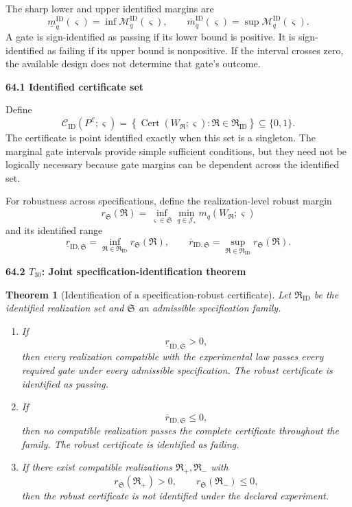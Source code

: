 \documentclass[11pt,letterpaper]{article}
\newcommand{\subtopic}[1]{%
 \vspace{0.45em}
 {\bfseries\color{AccentColor} #1\par}
}
\theoremstyle{plain}
\newtheorem{theorem}{Theorem}
\theoremstyle{definition}
\begin{document}
The sharp lower and upper identified margins are
\[
\underline m_q^{\mathrm{ID}}(\varsigma)
=
\inf\mathcal M_q^{\mathrm{ID}}(\varsigma),
\qquad
\overline m_q^{\mathrm{ID}}(\varsigma)
=
\sup\mathcal M_q^{\mathrm{ID}}(\varsigma).
\]
A gate is sign-identified as passing if its lower bound is positive. It is
sign-identified as failing if its upper bound is nonpositive. If the interval
crosses zero, the available design does not determine that gate's outcome.

\subtopic{64.1 Identified certificate set}

Define
\[
\boxed{
\mathcal C_{\mathrm{ID}}
(P^{\mathcal E};\varsigma)
=
\left\{
\operatorname{Cert}(W_{\mathfrak R};\varsigma):
\mathfrak R\in\mathfrak R_{\mathrm{ID}}
\right\}
\subseteq\{0,1\}.
}
\]
The certificate is point identified exactly when this set is a singleton. The
marginal gate intervals provide simple sufficient conditions, but they need
not be logically necessary because gate margins can be dependent across the
identified set.

For robustness across specifications, define the realization-level robust
margin
\[
r_{\mathfrak S}(\mathfrak R)
=
\inf_{\varsigma\in\mathfrak S}
\min_{q\in\mathcal J_*}
 m_q(W_{\mathfrak R};\varsigma)
\]
and its identified range
\[
\underline r_{\mathrm{ID},\mathfrak S}
=
\inf_{\mathfrak R\in\mathfrak R_{\mathrm{ID}}}
 r_{\mathfrak S}(\mathfrak R),
\qquad
\overline r_{\mathrm{ID},\mathfrak S}
=
\sup_{\mathfrak R\in\mathfrak R_{\mathrm{ID}}}
 r_{\mathfrak S}(\mathfrak R).
\]

\subtopic{64.2 \(T_{30}\): Joint specification-identification theorem}

\begin{theorem}[Identification of a specification-robust certificate]
\label{thm:joint-spec-identification}
Let \(\mathfrak R_{\mathrm{ID}}\) be the identified realization set and
\(\mathfrak S\) an admissible specification family.
\begin{enumerate}
\item If
\[
\boxed{
\underline r_{\mathrm{ID},\mathfrak S}>0,
}
\]
then every realization compatible with the experimental law passes every
required gate under every admissible specification. The robust certificate is
identified as passing.
\item If
\[
\boxed{
\overline r_{\mathrm{ID},\mathfrak S}\leq0,
}
\]
then no compatible realization passes the complete certificate throughout the
family. The robust certificate is identified as failing.
\item If there exist compatible realizations
\(\mathfrak R_+,\mathfrak R_-\) with
\[
r_{\mathfrak S}(\mathfrak R_+)>0,
\qquad
r_{\mathfrak S}(\mathfrak R_-)\leq0,
\]
then the robust certificate is not identified under the declared experiment.
\end{enumerate}
\end{theorem}
\end{document}
